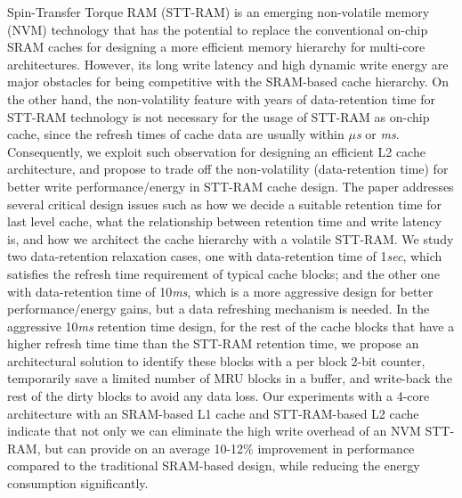 \singlespacing

Spin-Transfer Torque RAM (STT-RAM) is an emerging non-volatile memory (NVM)
technology that has the potential to replace the conventional
on-chip SRAM caches for designing a more efficient memory hierarchy for
multi-core architectures.
However, its long write latency and high dynamic
write energy are major obstacles for being competitive with the SRAM-based cache hierarchy.
On the other hand, the non-volatility feature with years of data-retention time for STT-RAM technology is not necessary for the usage of STT-RAM as on-chip cache, since the refresh times of cache data are usually within {\it $\mu$s} or {\it ms}. Consequently,  we exploit such observation for designing an efficient L2 cache
architecture, and propose to trade off the non-volatility (data-retention time)
for better write performance/energy in STT-RAM cache design. The paper addresses several critical design issues such as how we decide a suitable retention time for last level cache,
what the relationship between retention time and write latency is,
and how we architect the cache hierarchy with a volatile STT-RAM.
We study two
data-retention relaxation cases, one with data-retention time of 1{\it sec}, which satisfies the refresh time requirement of typical cache blocks; and the other one with data-retention time of 10{\it ms}, which is a more aggressive design for better performance/energy gains, but a data refreshing mechanism is needed.
In the aggressive 10{\it ms} retention time design, for the rest of the cache blocks that have a higher refresh time
time than the STT-RAM retention time, we propose an architectural solution to identify these blocks
with a per block 2-bit counter, temporarily save a limited number of MRU blocks in a buffer,
and write-back the rest of the dirty blocks to avoid any data loss.
Our experiments with a 4-core architecture with an SRAM-based L1 cache and STT-RAM-based L2 cache
indicate that not only we can eliminate the high write overhead of an NVM STT-RAM, but can provide
on an average 10-12\% improvement in performance compared to the traditional SRAM-based
design, while reducing the energy consumption significantly.

